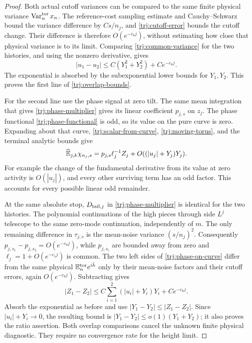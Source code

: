 \begin{proof}
Both actual cutoff variances can be compared to the same finite physical
variance \(\operatorname{Var}_n^{\rm tor}x_n\).  The reference-cost sampling estimate
and Cauchy--Schwarz bound the variance difference by \(Cs/n_j\), and
\eqref{trj:cutoff-error} bounds the cutoff change.  Their difference
is therefore \(O(e^{-c_8j})\), without estimating how close that physical
variance is to its limit.  Comparing \eqref{trj:common-variance} for
the two histories, and using the nonzero derivative, gives
\[
 |u_1-u_2|\le C(Y_1^2+Y_2^2)+Ce^{-c_8j}.
\]
The exponential is absorbed by the subexponential lower bounds for
\(Y_1,Y_2\).  This proves the first line of
\eqref{trj:overlap-bounds}.

For the second line use the phase signal at zero tilt.  The same mean
integration that gives \eqref{trj:phase-multiplier} gives its linear
coefficient \(p_{j,s}\) on \(z_j\).  The phase functional
\eqref{trj:phase-functional} is odd, so
its value on the pure curve is zero.  Expanding about that curve,
\eqref{trj:scalar-from-curve}, \eqref{trj:moving-torus}, and the
terminal analytic bounds give
\begin{equation}\label{trj:phase-on-curve}
 \widehat{\mathbb E}_{j,k}\chi_{n_j,s}
       =p_{j,s}\ell_j^{-1} Z_j
                     +O((|u_j|+Y_j)Y_j).
\end{equation}
For example the change of the fundamental derivative from its value
at zero activity is \(O(|u_j|)\), and every other surviving term has
an odd factor.  This accounts for every possible linear odd remainder.

At the same absolute stop, \(D_{{\rm tail},j}\) in
\eqref{trj:phase-multiplier} is identical for the two histories.
The polynomial continuations of the high pieces through side \(L^j\)
telescope to the same zero-mode continuation, independently of \(m\).
The only remaining difference in \(\tau_{j,s}\) is the mean-noise
variance \((s/n_j)^2\).  Consequently
\(p_{j,s_1}-p_{j,s_2}=O(e^{-c_8j})\), while \(p_{j,s_i}\) are bounded
away from zero and \(\ell_j=1+O(e^{-c_1j})\) is common.  The two left
sides of \eqref{trj:phase-on-curve} differ from the same physical
\(\mathbb E_n^{\rm tor}e^{i\bar h}\) only by their mean-noise factors and
their cutoff errors, again \(O(e^{-c_8j})\).  Subtracting gives
\[
 |Z_1-Z_2|\le C\sum_{i=1}^2(|u_i|+Y_i)Y_i+Ce^{-c_8j}.
\]
Absorb the exponential as before and use
\(|Y_1-Y_2|\le|Z_1-Z_2|\).  Since \(|u_i|+Y_i\to0\), the resulting
bound is \(|Y_1-Y_2|\le o(1)(Y_1+Y_2)\); it also proves the ratio
assertion.  Both overlap comparisons cancel the unknown finite physical
diagnostic.  They require no convergence rate for the height limit.
\end{proof}

